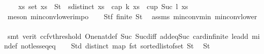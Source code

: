 \begin{isabellebody}
\ \ \ \ {\isachardoublequoteopen}{\isasymforall}xs{\isachardot}{\kern0pt}\ set\ xs\ {\isasymsubseteq}\ S{}t\ {\isasymand}\ {\isacharparenleft}{\kern0pt}sdistinct\ xs{\isacharparenright}{\kern0pt}\ {\isasymlongrightarrow}\ {\isasymnot}{\isacharparenleft}{\kern0pt}cap\ {\isacharparenleft}{\kern0pt}k{\isacharplus}{\kern0pt}{}{\isacharparenright}{\kern0pt}\ xs\ {\isasymor}\ cup\ {\isacharparenleft}{\kern0pt}Suc\ {\isacharparenleft}{\kern0pt}l{\isacharplus}{\kern0pt}{}{\isacharparenright}{\kern0pt}{\isacharparenright}{\kern0pt}\ xs{\isacharparenright}{\kern0pt}{\isachardoublequoteclose}\isanewline
\ \ \ \ \isamarkupfalse%
\ {\isacharparenleft}{\kern0pt}meson\ min{\isacharunderscore}{\kern0pt}conv{\isacharunderscore}{\kern0pt}lower{\isacharunderscore}{\kern0pt}imp{}o{\isacharparenright}{\kern0pt}\isanewline
\ \ \isamarkupfalse%
\ S{}tf{\isacharcolon}{\kern0pt}\ {\isachardoublequoteopen}finite\ S{}t{\isachardoublequoteclose}\ \isamarkupfalse%
\ assms{\isacharparenleft}{\kern0pt}{}{\isacharparenright}{\kern0pt}\ min{\isacharunderscore}{\kern0pt}conv{\isacharunderscore}{\kern0pt}min\ min{\isacharunderscore}{\kern0pt}conv{\isacharunderscore}{\kern0pt}lower\isanewline
\ \ \ \ \isamarkupfalse%
\ {\isacharparenleft}{\kern0pt}smt\ {\isacharparenleft}{\kern0pt}verit{\isacharcomma}{\kern0pt}\ ccfv{\isacharunderscore}{\kern0pt}threshold{\isacharparenright}{\kern0pt}\ One{\isacharunderscore}{\kern0pt}nat{\isacharunderscore}{\kern0pt}def\ Suc{\isacharunderscore}{\kern0pt}{}\ Suc{\isacharunderscore}{\kern0pt}diff{\isacharunderscore}{\kern0pt}{}\ add{\isacharunderscore}{\kern0pt}{}{\isacharunderscore}{\kern0pt}eq{\isacharunderscore}{\kern0pt}Suc{\isacharprime}{\kern0pt}\ card{\isachardot}{\kern0pt}infinite\ le{\isacharunderscore}{\kern0pt}add{}\ min{\isacharunderscore}{\kern0pt}def\ not{\isacharunderscore}{\kern0pt}less{\isacharunderscore}{\kern0pt}eq{\isacharunderscore}{\kern0pt}eq{\isacharparenright}{\kern0pt}\isanewline
\ \ \isamarkupfalse%
\ S{}td{\isacharcolon}{\kern0pt}\ {\isachardoublequoteopen}distinct\ {\isacharparenleft}{\kern0pt}map\ fst\ {\isacharparenleft}{\kern0pt}sorted{\isacharunderscore}{\kern0pt}list{\isacharunderscore}{\kern0pt}of{\isacharunderscore}{\kern0pt}set\ S{}t{\isacharparenright}{\kern0pt}{\isacharparenright}{\kern0pt}{\isachardoublequoteclose}\ \isamarkupfalse%
\ S{}t\isanewline

\end{isabellebody}
